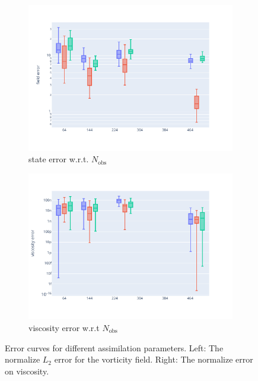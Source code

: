 \begin{figure}[htbp]
\begin{subfigure}{0.48\textwidth}
		\includegraphics[width=\linewidth]{./images/app2d/MSE_nobs_box.pdf}
		\caption{state error w.r.t. $N_{\text{obs}}$}
	\end{subfigure}
	\hfill
	\begin{subfigure}{0.45\textwidth}
		\captionsetup{labelformat=empty}
		\centering
		\includegraphics[width=\linewidth]{./images/app2d/MSE_visc_nobs_box.pdf}
		\caption{viscosity error w.r.t $N_{\text{obs}}$}
		\label{fig:nobs}
	\end{subfigure}
	\caption{Error curves for different assimilation parameters. Left: The normalize $L_2$ error for the vorticity field. Right: The normalize error on viscosity.}
	\label{fig:assim_params}
\end{figure}

